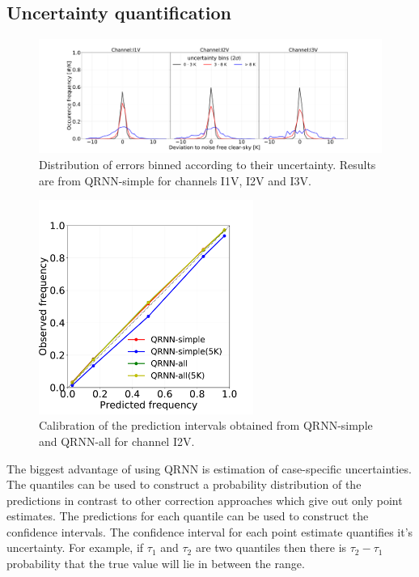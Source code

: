 \documentclass[amt, manuscript]{copernicus}
\begin{document}
\subsection{Uncertainty quantification}
%
\begin{figure}[t]
	\includegraphics[width=\textwidth]{Figures/PDF_uncertainty_bins_QRNN-single.pdf}	
	\caption{Distribution of errors binned according to their uncertainty. Results are from QRNN-simple for channels I1V, I2V and I3V.}
	\label{fig:error_distribution_uncertainty_bins_I1V}	
\end{figure}
\begin{figure}[t]
	\includegraphics[height = 70mm]{Figures/calibration_QRNN_I2V.pdf}	
	\caption{Calibration of the prediction intervals obtained from QRNN-simple and QRNN-all for channel I2V. }
	\label{fig:calibration_I2V}	
\end{figure}
The biggest advantage of using QRNN is estimation of case-specific uncertainties. The quantiles can be used to construct a probability distribution of the predictions in contrast to other correction approaches which give out only point estimates. The predictions for each quantile can be used to construct the confidence intervals. The confidence interval for each point estimate quantifies it's uncertainty. For example, if $\tau_1$ and $\tau_2$ are two quantiles then there is $\tau_2-\tau_1$ probability that the true value will lie in between the range.
\end{document}
